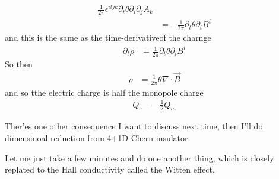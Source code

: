 \begin{enumerate}
\begin{align}
            \frac{1}{2\pi}
            \epsilon^{itjk} \partial_t \theta
            \partial_i \partial_j A_k\\
            &= -\frac{1}{2\pi} \partial_t \theta \partial_i B^i
        \end{align}
        and this is the same as the time-derivativeof the charnge
        \begin{align}
            \partial_t \rho &=
            \frac{1}{2\pi} \partial_t \theta \partial_i B^i
        \end{align}
        So then
        \begin{align}
            \rho &= \frac{1}{2\pi}\theta\nabla\cdot\vec{B}
        \end{align}
        and so tthe electric charge is half the monopole charge
        \begin{align}
            Q_e &= \frac{1}{2} Q_m
        \end{align}
\end{enumerate}

Ther'es one other consequence I want to discuss next time,
then I'll do dimensinoal reduction from 4+1D Chern insulator.

Let me just take a few minutes and do one another thing,
which is closely replated to the Hall conductivity called the Witten effect.

